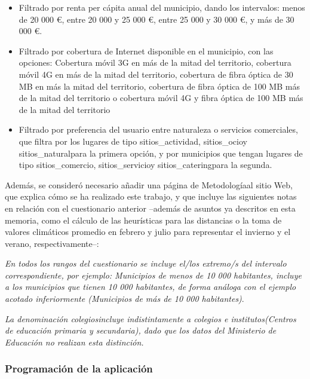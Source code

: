 \begin{itemize}
    \item Filtrado por renta per cápita anual del municipio, dando los intervalos: menos de 20 000 €, entre 20 000 y 25 000 €, entre 25 000 y 30 000 €, y más de 30 000 €.
    \item Filtrado por cobertura de Internet disponible en el municipio, con las opciones: Cobertura móvil 3G en más de la mitad del territorio, cobertura móvil 4G en más de la mitad del territorio, cobertura de fibra óptica de 30 MB en más la mitad del territorio, cobertura de fibra óptica de 100 MB más de la mitad del territorio o cobertura móvil 4G y fibra óptica de 100 MB más de la mitad del territorio
    \item Filtrado por preferencia del usuario entre naturaleza o servicios comerciales, que filtra por los lugares de tipo \guillemotleft sitios\_actividad\guillemotright, \guillemotleft sitios\_ocio\guillemotright\space y \guillemotleft sitios\_natural\guillemotright\space para la primera opción, y por municipios que tengan lugares de tipo \guillemotleft sitios\_comercio\guillemotright, \guillemotleft sitios\_servicio\guillemotright\space y \guillemotleft sitios\_catering\guillemotright\space para la segunda.
\end{itemize}

Además, se consideró necesario añadir una página de \guillemotleft Metodología\guillemotright\space al sitio Web, que explica cómo se ha realizado este trabajo, y que incluye las siguientes notas en relación con el cuestionario anterior –además de asuntos ya descritos en esta memoria, como el cálculo de las heurísticas para las distancias o la toma de valores climáticos promedio en febrero y julio para representar el invierno y el verano, respectivamente–:

\textit{En todos los rangos del cuestionario se incluye el/los extremo/s del intervalo correspondiente, por ejemplo: \guillemotleft Municipios de menos de 10 000 habitantes\guillemotright, incluye a los municipios que tienen 10 000 habitantes, de forma análoga con el ejemplo acotado inferiormente (\guillemotleft Municipios de más de 10 000 habitantes\guillemotright\space)}.

\textit{La denominación \guillemotleft colegios\guillemotright\space incluye indistintamente a \guillemotleft colegios e institutos\guillemotright\space (Centros de educación primaria y secundaria), dado que los datos del Ministerio de Educación no realizan esta distinción.}

\subsubsection{Programación de la aplicación}

